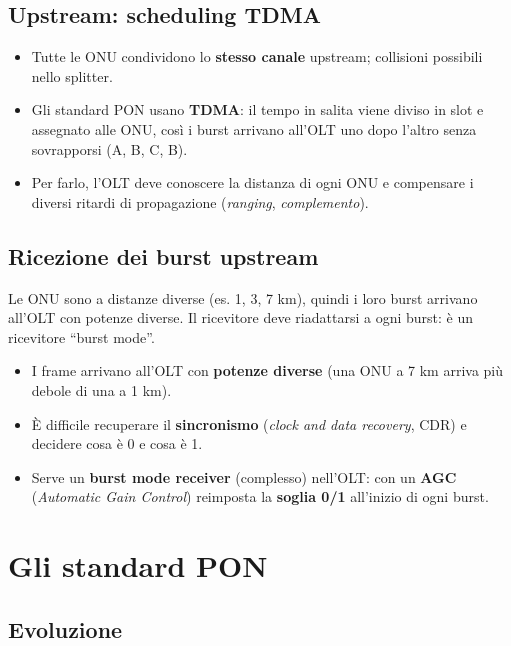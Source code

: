 \subsection{Upstream: scheduling TDMA}

\begin{itemize}
\tightlist
\item
  Tutte le ONU condividono lo \textbf{stesso canale} upstream; collisioni possibili nello splitter.
\item
  Gli standard PON usano \textbf{TDMA}: il tempo in salita viene diviso in slot e assegnato alle ONU, così i burst arrivano all'OLT uno dopo l'altro senza sovrapporsi (A, B, C, B).
\item
  Per farlo, l'OLT deve conoscere la distanza di ogni ONU e compensare i diversi ritardi di propagazione (\emph{ranging}, \emph{complemento}).
\end{itemize}

\subsection{Ricezione dei burst upstream}

\begin{inbreve}

Le ONU sono a distanze diverse (es. 1, 3, 7 km), quindi i loro burst arrivano all'OLT con potenze diverse. Il ricevitore deve riadattarsi a ogni burst: è un ricevitore ``burst mode''.

\end{inbreve}

\begin{itemize}
\tightlist
\item
  I frame arrivano all'OLT con \textbf{potenze diverse} (una ONU a 7 km arriva più debole di una a 1 km).
\item
  È difficile recuperare il \textbf{sincronismo} (\emph{clock and data recovery}, CDR) e decidere cosa è 0 e cosa è 1.
\item
  Serve un \textbf{burst mode receiver} (complesso) nell'OLT: con un \textbf{AGC} (\emph{Automatic Gain Control}) reimposta la \textbf{soglia 0/1} all'inizio di ogni burst.
\end{itemize}

\section{Gli standard PON}

\subsection{Evoluzione}

